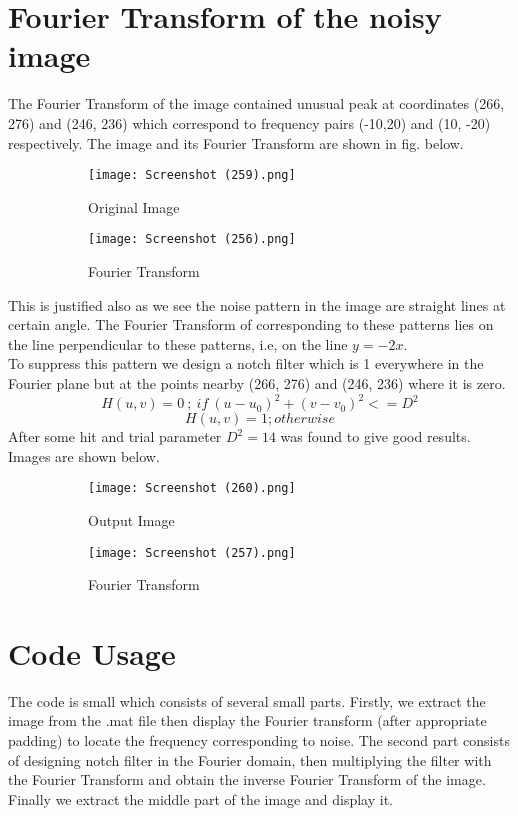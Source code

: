 \documentclass[12pt, a4paper]{article}
\begin{document}
\vspace*{-22pt}
\section{Fourier Transform of the noisy image}
The Fourier Transform of the image contained unusual peak at coordinates (266, 276) and (246, 236) which correspond to frequency pairs (-10,20) and (10, -20) respectively. The image and its Fourier Transform are shown in fig. below.
\begin{figure}[h!]
  \centering
  \begin{subfigure}[b]{0.35\linewidth}
    \texttt{[image: Screenshot (259).png]}
    \caption{Original Image}
  \end{subfigure}
  \begin{subfigure}[b]{0.35\linewidth}
    \texttt{[image: Screenshot (256).png]}
    \caption{Fourier Transform}
  \end{subfigure}
  \caption{}
  \label{fig:1}
\end{figure}
This is justified also as we see the noise pattern in the image are straight lines at certain angle. The Fourier Transform of corresponding to these patterns lies on the line perpendicular to these patterns, i.e, on the line $y = -2x$. \\

To suppress this pattern we design a notch filter which is 1 everywhere in the Fourier plane but at the points nearby (266, 276) and (246, 236) where it is zero. 
\begin{equation*}
    H(u, v) = 0  \ ;\  if \ (u - u_0)^2 + (v - v_0)^2 <= D^2
\end{equation*}
\begin{equation*}
     H(u, v) = 1  ; otherwise
\end{equation*}
After some hit and trial parameter $D^2 = 14$ was found to give good results. Images are shown below. 
\begin{figure}[h!]
  \centering
  \begin{subfigure}[b]{0.35\linewidth}
    \texttt{[image: Screenshot (260).png]}
    \caption{Output Image}
  \end{subfigure}
  \begin{subfigure}[b]{0.35\linewidth}
    \texttt{[image: Screenshot (257).png]}
    \caption{Fourier Transform}
  \end{subfigure}
  \caption{}
  \label{fig:2}
\end{figure}

\section{Code Usage}
The code is small which consists of several small parts. Firstly, we extract the image from the .mat file then display the Fourier transform (after appropriate padding) to locate the frequency corresponding to noise. The second part consists of designing notch filter in the Fourier domain, then multiplying the filter with the Fourier Transform and obtain the inverse Fourier Transform of the image. Finally we extract the middle part of the image and display it.
\end{document}
